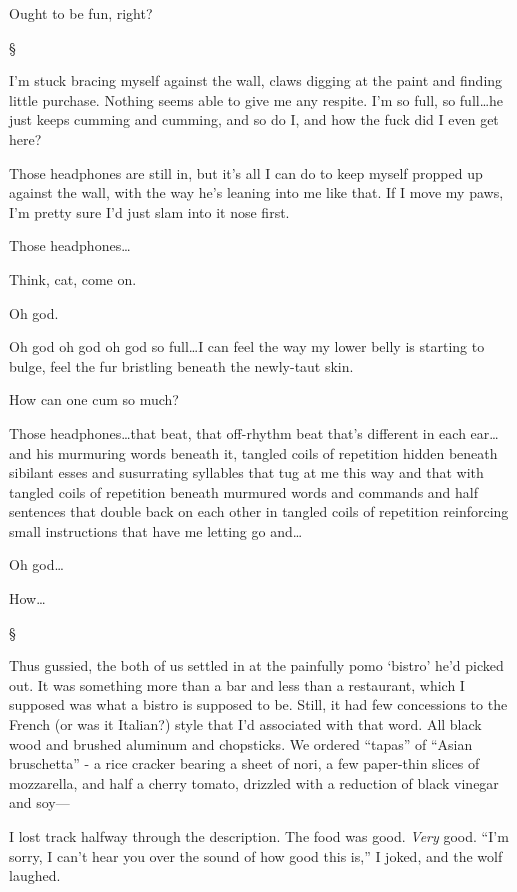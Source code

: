 \documentclass[12pt,letterpaper,oneside]{memoir}
\newcommand\secdiv{
  \begin{center}
    \S
  \end{center}
}
\begin{document}
  Ought to be fun, right?

  \secdiv

  I'm stuck bracing myself against the wall, claws digging at the paint and finding little purchase. Nothing seems able to give me any respite. I'm so full, so full\ldots{}he just keeps cumming and cumming, and so do I, and how the fuck did I even get here?

  Those headphones are still in, but it's all I can do to keep myself propped up against the wall, with the way he's leaning into me like that. If I move my paws, I'm pretty sure I'd just slam into it nose first.

  Those headphones\ldots{}

  Think, cat, come on.

  Oh god.

  Oh god oh god oh god so full\ldots{}I can feel the way my lower belly is starting to bulge, feel the fur bristling beneath the newly-taut skin.

  How can one cum so much?

  Those headphones\ldots{}that beat, that off-rhythm beat that's different in each ear\ldots{}and his murmuring words beneath it, tangled coils of repetition hidden beneath sibilant esses and susurrating syllables that tug at me this way and that with tangled coils of repetition beneath murmured words and commands and half sentences that double back on each other in tangled coils of repetition reinforcing small instructions that have me letting go and\ldots{}

  Oh god\ldots{}

  How\ldots{}

  \secdiv

  Thus gussied, the both of us settled in at the painfully pomo `bistro' he'd picked out. It was something more than a bar and less than a restaurant, which I supposed was what a bistro is supposed to be. Still, it had few concessions to the French (or was it Italian?) style that I'd associated with that word. All black wood and brushed aluminum and chopsticks. We ordered ``tapas'' of ``Asian bruschetta'' - a rice cracker bearing a sheet of nori, a few paper-thin slices of mozzarella, and half a cherry tomato, drizzled with a reduction of black vinegar and soy---

  I lost track halfway through the description. The food was good. \emph{Very} good. ``I'm sorry, I can't hear you over the sound of how good this is,'' I joked, and the wolf laughed.
\end{document}
